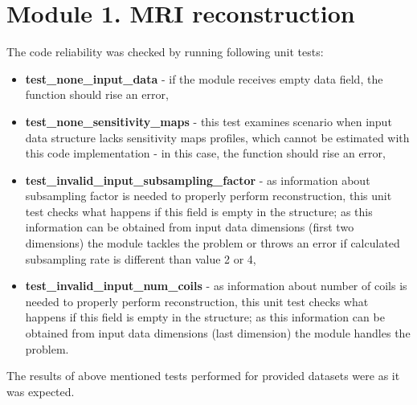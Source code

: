 \section{Module 1. MRI reconstruction}

The code reliability was checked by running following unit tests:  
\begin{itemize}
	\item \textbf{test\_none\_input\_data} - if the module receives empty data field, the function should rise an error,
	\item \textbf{test\_none\_sensitivity\_maps} - this test examines scenario when input data structure lacks sensitivity maps profiles, which cannot be estimated with this code implementation - in this case, the function should rise an error,
	\item \textbf{test\_invalid\_input\_subsampling\_factor} - as information about subsampling factor is needed to properly perform reconstruction, this unit test checks what happens if this field is empty in the structure; as this information can be obtained from input data dimensions (first two dimensions) the module tackles the problem or throws an error if calculated subsampling rate is different than value 2 or 4,
	\item \textbf{test\_invalid\_input\_num\_coils} - as information about number of coils is needed to properly perform reconstruction, this unit test checks what happens if this field is empty in the structure; as this information can be obtained from input data dimensions (last dimension) the module handles the problem.
\end{itemize}

The results of above mentioned tests performed for provided datasets were as it was expected. 
